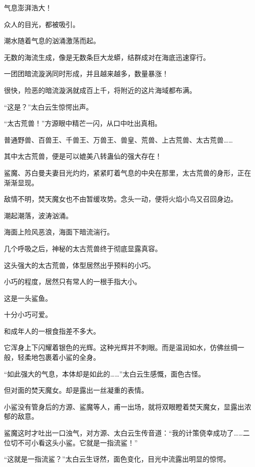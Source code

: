 
\begin{this_body}



气息澎湃浩大！

众人的目光，都被吸引。

潮水随着气息的汹涌激荡而起。

无数的海流生成，像是无数条巨大龙蟒，结群成对在海底迅速穿行。

一团团暗流漩涡同时形成，并且越来越多，数量暴涨！

很快，险恶的暗流漩涡就成百上千，将附近的这片海域都布满。

“这是？”太白云生惊愕出声。

“太古荒兽！”方源眼中精芒一闪，从口中吐出真相。

普通野兽、百兽王、千兽王、万兽王、兽皇、荒兽、上古荒兽、太古荒兽……

其中太古荒兽，便是可以媲美八转蛊仙的强大存在！

鲨魔、苏白曼夫妻目光灼灼，紧紧盯着气息的中央在那里，太古荒兽的身形，正在渐渐显现。

敌情不明，焚天魔女也不由暂缓攻势。念头一动，便将火焰小鸟又召回身边。

潮起潮落，波涛汹涌。

海面上险风恶浪，海面下暗流湍行。

几个呼吸之后，神秘的太古荒兽终于彻底显露真容。

这头强大的太古荒兽，体型居然出乎预料的小巧。

小巧的程度，居然只有常人的一根手指大小。

这是一头鲨鱼。

十分小巧可爱。

和成年人的一根食指差不多大。

它浑身上下闪耀着银色的光辉。这种光辉并不刺眼。而是温润如水，仿佛丝绸一般，轻柔地包裹着小鲨的全身。

“如此强大的气息，本体却是如此的……”太白云生感慨，面色古怪。

但对面的焚天魔女。却是露出一丝凝重的表情。

小鲨没有管身后的方源、鲨魔等人，甫一出场，就将双眼瞪着焚天魔女，显露出浓郁的敌意。

鲨魔这时才吐出一口浊气，对方源、太白云生传音道：“我的计策侥幸成功了……二位切不可小看这头小鲨。它就是一指流鲨！”

“这就是一指流鲨？”太白云生讶然，面色变化，目光中流露出明显的惊愕。


\end{this_body}

